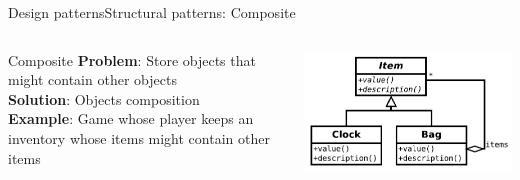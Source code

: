 \documentclass[10pt,compress]{beamer} %
\begin{document}
\begin{frame}{Design patterns}{Structural patterns: Composite}
    \begin{columns}
	   \begin{block}{Composite}
			\textbf{Problem}: Store objects that might contain other objects\\
			\textbf{Solution}: Objects composition\\
			\textbf{Example}: Game whose player keeps an inventory whose items might contain other items\\
		\end{block}
			\centering\includegraphics[width=\linewidth]{figs/composite}
	\end{columns}
\end{frame}
\end{document}
